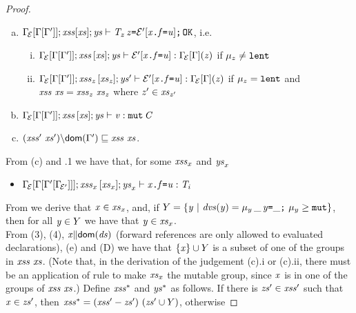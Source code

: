 {\begin{proof}
\begin{enumerate} [(a)]
\item ${\Gamma_{\!{\cal{E}}}[\Gamma[\Gamma']]};\mathit{xss}[\mathit{xs}];\mathit{ys}\vdash \mathit{T}_z\,\mathit{z}\texttt{=}{\cal{E}'}[\mathit{x}\texttt{.}\mathit{f}\texttt{=}\mathit{u}]\texttt{;}\,{\tt OK}$, i.e.
\begin{enumerate}[i.]
\item ${\Gamma_{\!{\cal{E}}}[\Gamma[\Gamma']]};\mathit{xss}\,[\mathit{xs}];\mathit{ys}\vdash {\cal{E}'}[\mathit{x}\texttt{.}\mathit{f}\texttt{=}\mathit{u}]:{\Gamma_{\!{\cal{E}}}[\Gamma]}(\mathit{z})$ if $\mu_z\neq\texttt{lent}$
\item ${\Gamma_{\!{\cal{E}}}[\Gamma[\Gamma']]};\mathit{xss}_{\mathit{z}}\,[\mathit{xs}_{\mathit{z}}];\mathit{ys}'\vdash {\cal{E}'}[\mathit{x}\texttt{.}\mathit{f}\texttt{=}\mathit{u}]:{\Gamma_{\!{\cal{E}}}[\Gamma]}(\mathit{z})$ if $\mu_z=\texttt{lent}$ and $\mathit{xss}\ \mathit{xs}=\mathit{xss}_{\mathit{z}}\ \mathit{xs}_{\mathit{z}}$ where $\mathit{z}'\in\mathit{xs}_{\mathit{z}'}$
\end{enumerate}
\item ${\Gamma_{\!{\cal{E}}}[\Gamma[\Gamma']]};\mathit{xss}\,[\mathit{xs}];\mathit{ys}\vdash \mathit{v}:\texttt{mut}\,\mathit{C}$
\item $\LessEq{(\LentLocked'\ \xs'){\setminus}\dom{\Gamma'}}{\LentLocked\ \xs}$. 
\end{enumerate}
From (c) and .1 we have that, for some $\mathit{xss}_x$ and $\mathit{ys}_x$
\begin{itemize}
\item ${\Gamma_{\!{\cal{E}}}[\Gamma[\Gamma'[\Gamma_{\!{\cal{E}'}}]]]};\mathit{xss}_x\,[\mathit{xs}_x];\mathit{ys}_x\vdash \mathit{x}\texttt{.}\mathit{f}\texttt{=}\mathit{u}:\mathit{T}_i$
\end{itemize}
From  we derive that $\mathit{x}\in\mathit{xs}_x$, and, 
if $Y=\{\y\ |\ \dvs(\y)=\Dec{\Type{\mu_y}{\_}}{\y}{\_}\ \mu_y\geq\mutable\}$, then
for all $\mathit{y}\in Y$ we have that $\mathit{y}\in\mathit{xs}_x$.\\
From (3), (4),  $\mathit{x}{\parallel}\textsf{dom}(\mathit{ds})$ (forward references are only allowed to
evaluated declarations), (e) and (D) we have that $\{\mathit{x}\}\cup Y$ is a subset of one of the groups 
in $\LentLocked\ \xs$. 
(Note that, in the derivation of the judgement (c).i or (c).ii, there must be an application of rule  to
make $\mathit{xs}_x$ the mutable group, since $\mathit{x}$ is in one of the groups of $\LentLocked\ \xs$.)
Define $\mathit{xss}^{\ast}$ and $\mathit{ys}^{\ast}$ as follows. If there is $\mathit{zs}'\in\mathit{xss}'$ such that
$\mathit{x}\in\mathit{zs}'$, then $\mathit{xss}^{\ast}=(\mathit{xss}'-\mathit{zs}')\ (\mathit{zs}'\cup Y)$, otherwise  

\end{proof}}
